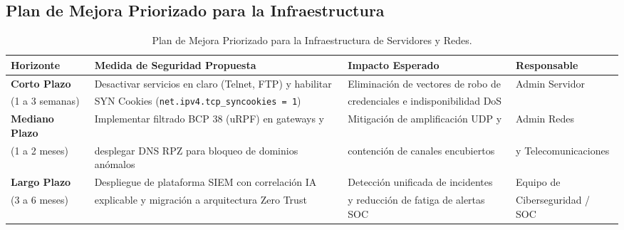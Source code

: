 \documentclass[11pt,letterpaper]{article}
\begin{document}
\subsection{Plan de Mejora Priorizado para la Infraestructura}
\begin{table}[H]
    \centering
    \small
    \begin{tabular}{@{}llll@{}}
        \toprule
        \textbf{Horizonte} & \textbf{Medida de Seguridad Propuesta} & \textbf{Impacto Esperado} & \textbf{Responsable} \\
        \midrule
        \textbf{Corto Plazo} & Desactivar servicios en claro (Telnet, FTP) y habilitar & Eliminación de vectores de robo de & Admin Servidor \\
        (1 a 3 semanas) & SYN Cookies (\texttt{net.ipv4.tcp\_syncookies = 1}) & credenciales e indisponibilidad DoS & \\
        \midrule
        \textbf{Mediano Plazo} & Implementar filtrado BCP 38 (uRPF) en gateways y & Mitigación de amplificación UDP y & Admin Redes \\
        (1 a 2 meses) & desplegar DNS RPZ para bloqueo de dominios anómalos & contención de canales encubiertos & y Telecomunicaciones \\
        \midrule
        \textbf{Largo Plazo} & Despliegue de plataforma SIEM con correlación IA & Detección unificada de incidentes & Equipo de \\
        (3 a 6 meses) & explicable y migración a arquitectura Zero Trust & y reducción de fatiga de alertas SOC & Ciberseguridad / SOC \\
        \bottomrule
    \end{tabular}
    \caption{Plan de Mejora Priorizado para la Infraestructura de Servidores y Redes.}
\end{table}
\end{document}
